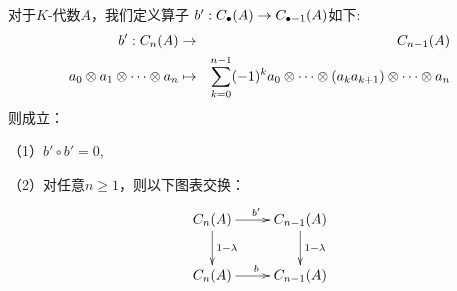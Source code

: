 










\begin{lemma}
对于$K$-代数$A$，我们定义算子
$b':C_{\bullet}(A)\to C_{\bullet-1}(A)$如下:
\begin{eqnarray*}
b':C_{n}(A)&\to&C_{n-1}(A)\\
a_0\otimes a_1\otimes\cdots\otimes a_n&\mapsto&
\sum_{k=0}^{n-1}(-1)^{k}
a_0\otimes\cdots\otimes(a_ka_{k+1})\otimes\cdots\otimes a_n
\end{eqnarray*}
则成立：

（1）$b'\circ b'=0$,

（2）对任意$n\geq 1$，则以下图表交换：
$$\xymatrix{
     C_n(A) \ar[d]^{1-\lmd} \ar[r]^{b'}
   & C_{n-1}(A)\ar[d]^{1-\lmd}
\\
     C_n(A) \ar[r]^b
   & C_{n-1}(A)
}$$
\end{lemma}

